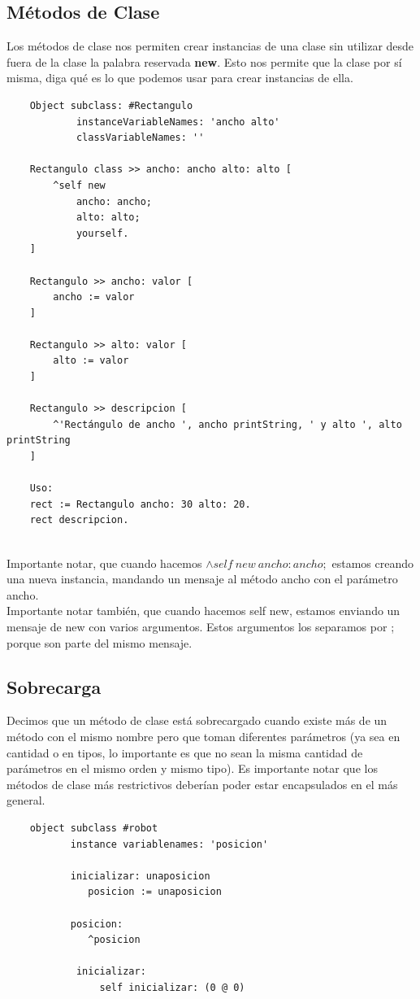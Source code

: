 \documentclass[10pt,a4paper]{article}
\begin{document}
\subsection*{Métodos de Clase}
Los métodos de clase nos permiten crear instancias de una clase sin utilizar desde fuera de la clase la palabra reservada \textbf{new}. Esto nos permite que la clase por sí misma, diga qué es lo que podemos usar para crear instancias de ella. 
\begin{lstlisting}
    Object subclass: #Rectangulo 
            instanceVariableNames: 'ancho alto'
            classVariableNames: ''

    Rectangulo class >> ancho: ancho alto: alto [
        ^self new 
            ancho: ancho;
            alto: alto;
            yourself.
    ]

    Rectangulo >> ancho: valor [
        ancho := valor
    ]

    Rectangulo >> alto: valor [
        alto := valor
    ]

    Rectangulo >> descripcion [
        ^'Rectángulo de ancho ', ancho printString, ' y alto ', alto printString
    ]

    Uso: 
    rect := Rectangulo ancho: 30 alto: 20.
    rect descripcion.


\end{lstlisting}
Importante notar, que cuando hacemos $\land self \ new \ ancho: ancho;$ estamos creando una nueva instancia, mandando un mensaje al método ancho con el parámetro ancho. \\
Importante notar también, que cuando hacemos self new, estamos enviando un mensaje de new con varios argumentos. Estos argumentos los separamos por ; porque son parte del mismo mensaje.
\subsection*{Sobrecarga}
Decimos que un método de clase está sobrecargado cuando existe más de un método con el mismo nombre pero que toman diferentes parámetros (ya sea en cantidad o en tipos, lo importante es que no sean la misma cantidad de parámetros en el mismo orden y mismo tipo). Es importante notar que los métodos de clase más restrictivos deberían poder estar encapsulados en el más general. 
\begin{lstlisting}
    object subclass #robot 
           instance variablenames: 'posicion'

           inicializar: unaposicion
              posicion := unaposicion 

           posicion:
              ^posicion 
    
            inicializar:
                self inicializar: (0 @ 0)
\end{lstlisting}
\end{document}
